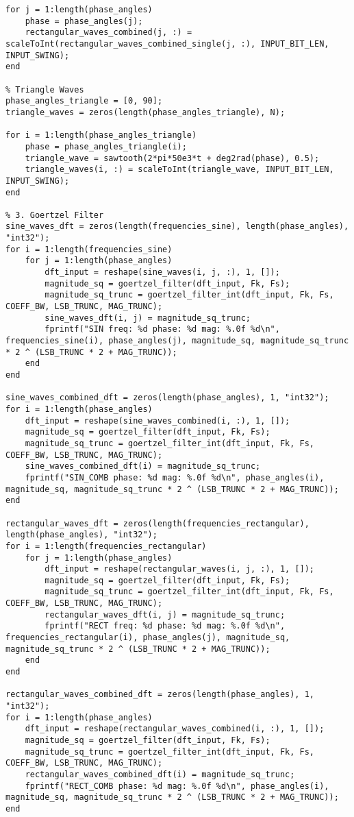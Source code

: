 \begin{lstlisting}
for j = 1:length(phase_angles)
    phase = phase_angles(j);
    rectangular_waves_combined(j, :) = scaleToInt(rectangular_waves_combined_single(j, :), INPUT_BIT_LEN, INPUT_SWING);
end

% Triangle Waves
phase_angles_triangle = [0, 90];
triangle_waves = zeros(length(phase_angles_triangle), N);

for i = 1:length(phase_angles_triangle)
    phase = phase_angles_triangle(i);
    triangle_wave = sawtooth(2*pi*50e3*t + deg2rad(phase), 0.5);
    triangle_waves(i, :) = scaleToInt(triangle_wave, INPUT_BIT_LEN, INPUT_SWING);
end

% 3. Goertzel Filter
sine_waves_dft = zeros(length(frequencies_sine), length(phase_angles), "int32");
for i = 1:length(frequencies_sine)
    for j = 1:length(phase_angles)
        dft_input = reshape(sine_waves(i, j, :), 1, []);
        magnitude_sq = goertzel_filter(dft_input, Fk, Fs);
        magnitude_sq_trunc = goertzel_filter_int(dft_input, Fk, Fs, COEFF_BW, LSB_TRUNC, MAG_TRUNC);
        sine_waves_dft(i, j) = magnitude_sq_trunc;
        fprintf("SIN freq: %d phase: %d mag: %.0f %d\n", frequencies_sine(i), phase_angles(j), magnitude_sq, magnitude_sq_trunc * 2 ^ (LSB_TRUNC * 2 + MAG_TRUNC));
    end
end

sine_waves_combined_dft = zeros(length(phase_angles), 1, "int32");
for i = 1:length(phase_angles)
    dft_input = reshape(sine_waves_combined(i, :), 1, []);
    magnitude_sq = goertzel_filter(dft_input, Fk, Fs);
    magnitude_sq_trunc = goertzel_filter_int(dft_input, Fk, Fs, COEFF_BW, LSB_TRUNC, MAG_TRUNC);
    sine_waves_combined_dft(i) = magnitude_sq_trunc;
    fprintf("SIN_COMB phase: %d mag: %.0f %d\n", phase_angles(i), magnitude_sq, magnitude_sq_trunc * 2 ^ (LSB_TRUNC * 2 + MAG_TRUNC));
end

rectangular_waves_dft = zeros(length(frequencies_rectangular), length(phase_angles), "int32");
for i = 1:length(frequencies_rectangular)
    for j = 1:length(phase_angles)
        dft_input = reshape(rectangular_waves(i, j, :), 1, []);
        magnitude_sq = goertzel_filter(dft_input, Fk, Fs);
        magnitude_sq_trunc = goertzel_filter_int(dft_input, Fk, Fs, COEFF_BW, LSB_TRUNC, MAG_TRUNC);
        rectangular_waves_dft(i, j) = magnitude_sq_trunc;
        fprintf("RECT freq: %d phase: %d mag: %.0f %d\n", frequencies_rectangular(i), phase_angles(j), magnitude_sq, magnitude_sq_trunc * 2 ^ (LSB_TRUNC * 2 + MAG_TRUNC));
    end
end

rectangular_waves_combined_dft = zeros(length(phase_angles), 1, "int32");
for i = 1:length(phase_angles)
    dft_input = reshape(rectangular_waves_combined(i, :), 1, []);
    magnitude_sq = goertzel_filter(dft_input, Fk, Fs);
    magnitude_sq_trunc = goertzel_filter_int(dft_input, Fk, Fs, COEFF_BW, LSB_TRUNC, MAG_TRUNC);
    rectangular_waves_combined_dft(i) = magnitude_sq_trunc;
    fprintf("RECT_COMB phase: %d mag: %.0f %d\n", phase_angles(i), magnitude_sq, magnitude_sq_trunc * 2 ^ (LSB_TRUNC * 2 + MAG_TRUNC));
end


\end{lstlisting}

